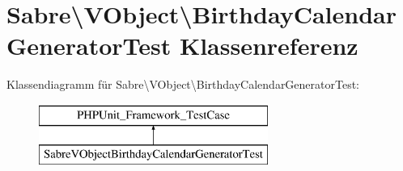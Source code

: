 \hypertarget{class_sabre_1_1_v_object_1_1_birthday_calendar_generator_test}{}\section{Sabre\textbackslash{}V\+Object\textbackslash{}Birthday\+Calendar\+Generator\+Test Klassenreferenz}
\label{class_sabre_1_1_v_object_1_1_birthday_calendar_generator_test}
Klassendiagramm für Sabre\textbackslash{}V\+Object\textbackslash{}Birthday\+Calendar\+Generator\+Test\+:\begin{figure}[H]
\begin{center}
\leavevmode
\includegraphics[height=2.000000cm]{class_sabre_1_1_v_object_1_1_birthday_calendar_generator_test}
\end{center}
\end{figure}
